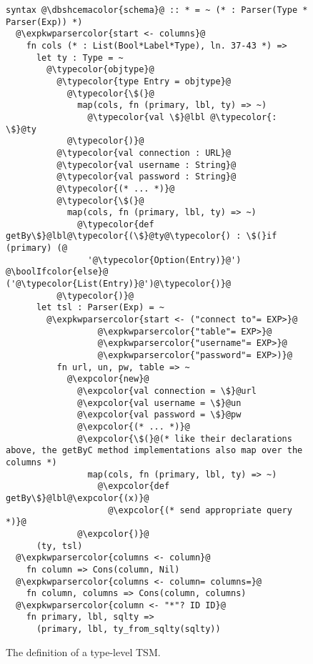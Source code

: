 \documentclass{sig-alternate}[10pt]
\newcommand{\expkwparsercolor}[1]{\textcolor[HTML]{336699}{#1}}
\newcommand{\expcolor}[1]{\textcolor[HTML]{FF0033}{#1}}
\newcommand{\typecolor}[1]{\textcolor[HTML]{660066}{#1}}
\newcommand{\boolIfcolor}[1]{\textcolor[HTML]{5E0C0C}{#1}}
\newcommand{\dbshcemacolor}[1]{\textcolor[HTML]{5AC3D1}{#1}}
\newcommand{\mycaption}[1]{\vspace{-10px}\caption{#1}\vspace{-10px}}
\begin{document}
\begin{figure}[t]
\begin{lstlisting}[style=wyvern]
syntax @\dbshcemacolor{schema}@ :: * = ~ (* : Parser(Type * Parser(Exp)) *)
  @\expkwparsercolor{start <- columns}@
    fn cols (* : List(Bool*Label*Type), ln. 37-43 *) =>
      let ty : Type = ~
        @\typecolor{objtype}@ 
          @\typecolor{type Entry = objtype}@
            @\typecolor{\$(}@
              map(cols, fn (primary, lbl, ty) => ~)
                @\typecolor{val \$}@lbl @\typecolor{:  \$}@ty
            @\typecolor{)}@
          @\typecolor{val connection : URL}@
          @\typecolor{val username : String}@
          @\typecolor{val password : String}@
          @\typecolor{(* ... *)}@
          @\typecolor{\$(}@
            map(cols, fn (primary, lbl, ty) => ~)
              @\typecolor{def getBy\$}@lbl@\typecolor{(\$}@ty@\typecolor{) : \$(}if (primary) (@
                '@\typecolor{Option(Entry)}@') @\boolIfcolor{else}@ ('@\typecolor{List(Entry)}@')@\typecolor{)}@
          @\typecolor{)}@
      let tsl : Parser(Exp) = ~ 
        @\expkwparsercolor{start <- ("connect to"= EXP>}@
                  @\expkwparsercolor{"table"= EXP>}@
                  @\expkwparsercolor{"username"= EXP>}@
                  @\expkwparsercolor{"password"= EXP>)}@
          fn url, un, pw, table => ~
            @\expcolor{new}@ 
              @\expcolor{val connection = \$}@url
              @\expcolor{val username = \$}@un
              @\expcolor{val password = \$}@pw
              @\expcolor{(* ... *)}@
              @\expcolor{\$(}@(* like their declarations above, the getByC method implementations also map over the columns *)
                map(cols, fn (primary, lbl, ty) => ~)
                  @\expcolor{def getBy\$}@lbl@\expcolor{(x)}@ 
                    @\expcolor{(* send appropriate query *)}@
              @\expcolor{)}@
      (ty, tsl)
  @\expkwparsercolor{columns <- column}@
    fn column => Cons(column, Nil)
  @\expkwparsercolor{columns <- column= columns=}@
    fn column, columns => Cons(column, columns)
  @\expkwparsercolor{column <- "*"? ID ID}@
    fn primary, lbl, sqlty => 
      (primary, lbl, ty_from_sqlty(sqlty))
\end{lstlisting}
\mycaption{The definition of a type-level TSM.}
\label{typekw-example-1}
\end{figure}
\end{document}
